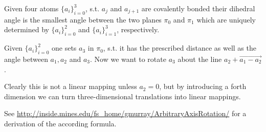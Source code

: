 Given four atoms $\{a_i\}_{i=0}^3$, s.t. $a_j$ and $a_{j+1}$ are covalently bonded their dihedral angle is the smallest angle between the two planes $\pi_0$ and $\pi_1$ which are uniquely determined by $\{a_i\}_{i=0}^2$ and $\{a_i\}_{i=1}^3$, respectively.

Given $\{a_i\}_{i=0}^2$ one sets $a_3$ in $π_0$, s.t. it has the prescribed distance as well as the angle between $a_1,a_2$ and $a_3$.
Now we want to rotate $a_3$ about the line $a_2 + \overrightarrow{a_1-a_2}$.

Clearly this is not a linear mapping unless $a_2=0$, but by introducing a forth dimension we can turn three-dimensional translations into linear mappings.

See \url{http://inside.mines.edu/fs_home/gmurray/ArbitraryAxisRotation/} for a derivation of the according formula.





